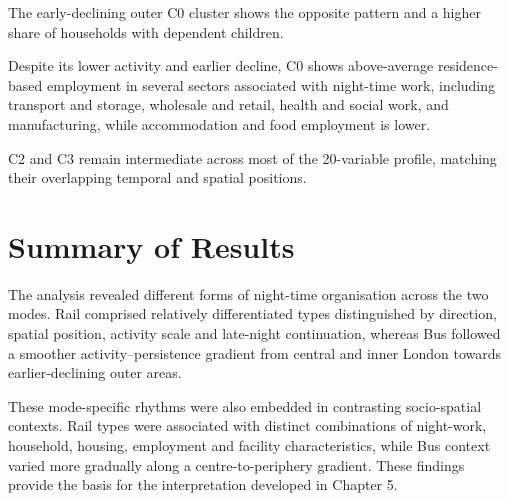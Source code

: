 The early-declining outer C0 cluster shows the opposite pattern and a higher share of households with dependent children.

Despite its lower activity and earlier decline, C0 shows above-average residence-based employment in several sectors associated with night-time work, including transport and storage, wholesale and retail, health and social work, and manufacturing, while accommodation and food employment is lower.

C2 and C3 remain intermediate across most of the 20-variable profile, matching their overlapping temporal and spatial positions.

\section{Summary of Results}

The analysis revealed different forms of night-time organisation across the two modes. Rail comprised relatively differentiated types distinguished by direction, spatial position, activity scale and late-night continuation, whereas Bus followed a smoother activity--persistence gradient from central and inner London towards earlier-declining outer areas.

These mode-specific rhythms were also embedded in contrasting socio-spatial contexts. Rail types were associated with distinct combinations of night-work, household, housing, employment and facility characteristics, while Bus context varied more gradually along a centre-to-periphery gradient. These findings provide the basis for the interpretation developed in Chapter 5.
